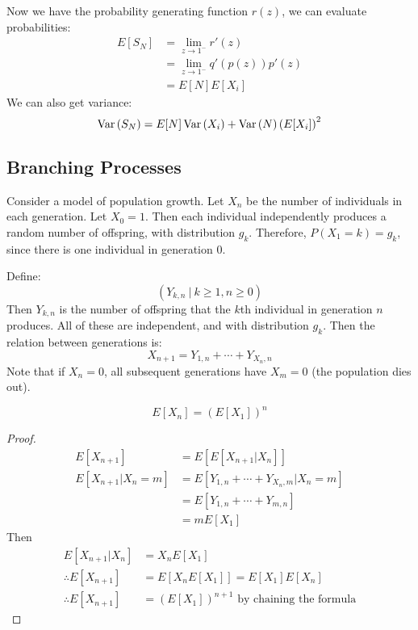 \documentclass[../Main.tex]{subfiles}
\begin{document}
Now we have the probability generating function $r(z)$, we can evaluate probabilities:
\begin{align*}
    E[S_N] &= \lim_{z \to 1^-} r'(z) \\
    &= \lim_{z \to 1^-} q'(p(z)) p'(z) \\
    &= E[N] E[X_i]
\end{align*}
We can also get variance:
\begin{equation*}
    \operatorname{Var}{(S_N)} = E[N] \operatorname{Var}{(X_i)} + \operatorname{Var}{(N)} \left(E[X_i]\right)^2
\end{equation*}
\subsection{Branching Processes}
Consider a model of population growth. Let $X_n$ be the number of individuals in each generation. Let $X_0 = 1$. Then each individual independently produces a random number of offspring, with distribution $g_k$. Therefore, $P(X_1 = k) = g_k$, since there is one individual in generation $0$.\par
Define:
\begin{equation*}
    \left(Y_{k, n}~|~k \geq 1, n \geq 0\right)
\end{equation*}
Then $Y_{k, n}$ is the number of offspring that the $k$th individual in generation $n$ produces. All of these are independent, and with distribution $g_k$. Then the relation between generations is:
\begin{equation*}
    X_{n + 1} = Y_{1, n} + \cdots + Y_{{X_n}, n}
\end{equation*}
Note that if $X_n = 0$, all subsequent generations have $X_m = 0$ (the population dies out).
\begin{theorem}
    \begin{equation*}
        E[X_n] = \left(E[X_1]\right)^n
    \end{equation*}
    \label{thmBranchingExpectation}
\end{theorem}
\begin{proof}
    \begin{align*}
        E[X_{n + 1}] &= E[E[X_{n + 1} | X_n]] \\
        E[X_{n + 1} | X_n = m] &= E[Y_{1, n} + \cdots + Y_{{X_n}, m} | X_n = m] \\
        &= E[Y_{1, n} + \cdots + Y_{m, n}] \\
        &= mE[X_1]
    \end{align*}
    Then
    \begin{align*}
        E[X_{n + 1} | X_n] &= X_n E[X_1] \\
        \therefore E[X_{n + 1}] &= E[X_n E[X_1]] = E[X_1] E[X_n] \\
        \therefore E[X_{n + 1}] &= \left(E[X_1]\right)^{n + 1} \text{ by chaining the formula}
    \end{align*}
\end{proof}
\end{document}
